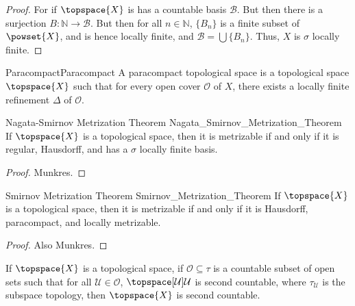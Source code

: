 \documentclass{article}                                                        %
\begin{document}
        \begin{proof}
            For if $\topspace{X}$ is has a countable basis $\mathcal{B}$. But
            then there is a surjection $B:\mathbb{N}\rightarrow\mathcal{B}$.
            But then for all $n\in\mathbb{N}$, $\{B_{n}\}$ is a finite subset
            of $\powset{X}$, and is hence locally finite, and
            $\mathcal{B}=\bigcup\{B_{n}\}$. Thus, $X$ is $\sigma$ locally
            finite.
        \end{proof}
        \begin{fdefinition}{Paracompact}{Paracompact}
            A paracompact topological space is a topological space
            $\topspace{X}$ such that for every open cover $\mathcal{O}$ of $X$,
            there exists a locally finite refinement $\Delta$ of $\mathcal{O}$.
        \end{fdefinition}
        \begin{ftheorem}{Nagata-Smirnov Metrization Theorem}
                        {Nagata_Smirnov_Metrization_Theorem}
            If $\topspace{X}$ is a topological space, then it is metrizable if
            and only if it is regular, Hausdorff, and has a $\sigma$ locally
            finite basis.
        \end{ftheorem}
        \begin{proof}
            Munkres.
        \end{proof}
        \begin{ftheorem}{Smirnov Metrization Theorem}
                        {Smirnov_Metrization_Theorem}
            If $\topspace{X}$ is a topological space, then it is metrizable if
            and only if it is Hausdorff, paracompact, and locally metrizable.
        \end{ftheorem}
        \begin{proof}
            Also Munkres.
        \end{proof}
        \begin{theorem}
            \label{thm:Count_Open_Cover_of_Sec_Count_Implies_Sec_Count}%
            If $\topspace{X}$ is a topological space, if
            $\mathcal{O}\subseteq\tau$ is a countable subset of open sets such
            that for all $\mathcal{U}\in\mathcal{O}$,
            $\topspace[\mathcal{U}]{\mathcal{U}}$ is second countable, where
            $\tau_{\mathcal{U}}$ is the subspace topology, then $\topspace{X}$
            is second countable.
        \end{theorem}
\end{document}
